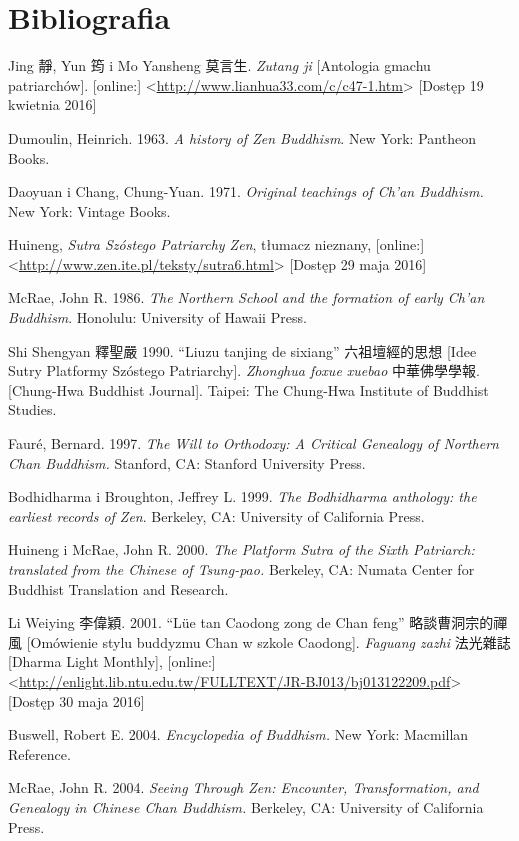 \onecolumn
\chapter*{Bibliografia}

Jing 靜, Yun 筠 i Mo Yansheng 莫言生. \textit{Zutang ji} [Antologia gmachu patriarchów]. [online:] <\url{http://www.lianhua33.com/c/c47-1.htm}> [Dostęp 19 kwietnia 2016]

Dumoulin, Heinrich. 1963. \textit{A history of Zen Buddhism}. New York: Pantheon Books.

Daoyuan i Chang, Chung-Yuan. 1971. \textit{Original teachings of Ch'an Buddhism.} New York: Vintage Books.

Huineng, \textit{Sutra Szóstego Patriarchy Zen}, tłumacz nieznany, [online:] <\url{http://www.zen.ite.pl/teksty/sutra6.html}> [Dostęp 29 maja 2016]

McRae, John R. 1986. \textit{The Northern School and the formation of early Ch'an Buddhism}. Honolulu: University of Hawaii Press.

Shi Shengyan 釋聖嚴 1990. ``Liuzu tanjing de sixiang'' 六祖壇經的思想 [Idee Sutry Platformy Szóstego Patriarchy]. \textit{Zhonghua foxue xuebao} 中華佛學學報. [Chung-Hwa Buddhist Journal]. Taipei: The Chung-Hwa Institute of Buddhist Studies.

Fauré, Bernard. 1997. \textit{The Will to Orthodoxy: A Critical Genealogy of Northern Chan Buddhism.} Stanford, CA: Stanford University Press.

Bodhidharma i Broughton, Jeffrey L. 1999. \textit{The Bodhidharma anthology: the earliest records of Zen}. Berkeley, CA: University of California Press.

Huineng i McRae, John R. 2000. \textit{The Platform Sutra of the Sixth Patriarch: translated from the Chinese of Tsung-pao.} Berkeley, CA: Numata Center for Buddhist Translation and Research.

Li Weiying 李偉穎. 2001. ``Lüe tan Caodong zong de Chan feng'' 略談曹洞宗的禪風 [Omówienie stylu buddyzmu Chan w szkole Caodong]. \textit{Faguang zazhi} 法光雜誌 [Dharma Light Monthly], [online:] <\url{http://enlight.lib.ntu.edu.tw/FULLTEXT/JR-BJ013/bj013122209.pdf}> [Dostęp 30 maja 2016]

Buswell, Robert E. 2004. \textit{Encyclopedia of Buddhism.} New York: Macmillan Reference.

McRae, John R. 2004. \textit{Seeing Through Zen: Encounter, Transformation, and Genealogy in Chinese Chan Buddhism.} Berkeley, CA: University of California Press.

